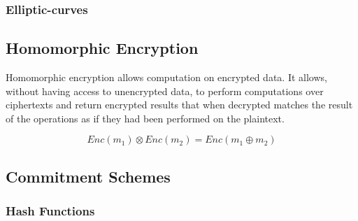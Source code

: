 \subsubsection{Elliptic-curves}
\label{preliminaries:crypto_block:pub:el_curves}

\subsection{Homomorphic Encryption}
\label{preliminaries:crypto_block:homo}

Homomorphic encryption allows computation on encrypted data. It allows, without having access to unencrypted data, to perform computations over ciphertexts and return encrypted results that when decrypted matches the result of the operations as if they had been performed on the plaintext.

\begin{equation*}
  Enc(m_1) \otimes Enc(m_2) = Enc(m_1 \oplus m_2)
\end{equation*}

\subsection{Commitment Schemes}
\label{preliminaries:crypto_block:comm}

\subsubsection{Hash Functions}
\label{preliminaries:crypto_block:pub:comm:hash}
